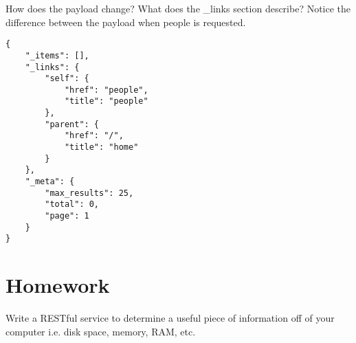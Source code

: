\documentclass{article}
\begin{document}
How does the payload change? What does the \_links section describe?
Notice the difference between the payload when people is requested.

\begin{verbatim}
{
    "_items": [],
    "_links": {
        "self": {
            "href": "people",
            "title": "people"
        },
        "parent": {
            "href": "/",
            "title": "home"
        }
    },
    "_meta": {
        "max_results": 25,
        "total": 0,
        "page": 1
    }
}
\end{verbatim}


\section{Homework}
Write a RESTful service to determine a useful piece of information off
of your computer i.e. disk space, memory, RAM, etc.
\end{document}
